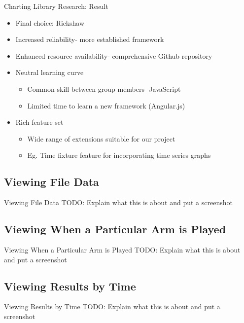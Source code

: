 \documentclass{beamer}
\begin{document}
\begin{frame}{Charting Library Research: Result}
\begin{itemize}
	\item Final choice: Rickshaw
	\item Increased reliability- more established framework
	\item Enhanced resource availability- comprehensive Github repository
	\item Neutral learning curve
		\begin{itemize}
			\item Common skill between group members- JavaScript
			\item Limited time to learn a new framework (Angular.js)
		\end{itemize}
	\item Rich feature set
		\begin{itemize}
			\item Wide range of extensions suitable for our project
			\item Eg. Time fixture feature for incorporating time series graphs
		\end{itemize}
\end{itemize}
\end{frame}

\subsection{Viewing File Data}
\begin{frame}{Viewing File Data}
TODO: Explain what this is about and put a screenshot
\end{frame}

\subsection{Viewing When a Particular Arm is Played}
\begin{frame}{Viewing When a Particular Arm is Played}
TODO: Explain what this is about and put a screenshot
\end{frame}

\subsection{Viewing Results by Time}
\begin{frame}{Viewing Results by Time}
TODO: Explain what this is about and put a screenshot
\end{frame}
\end{document}
